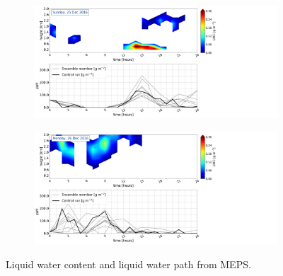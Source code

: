 \begin{figure}\ContinuedFloat
   		\centering
		\begin{subfigure}[b]{0.8\textwidth}
			\includegraphics[trim={0.5cm 0.5cm 17.5cm .5cm},clip,width=\textwidth]{./fig_LWC/20161225}
			\caption{}\label{fig:LWC25}
		\end{subfigure}
		\begin{subfigure}[b]{0.8\textwidth}
			\includegraphics[trim={0.5cm 0.5cm 17.5cm .5cm},clip,width=\textwidth]{./fig_LWC/20161226}
			\caption{}\label{fig:LWC26}
		\end{subfigure}
    \caption{Liquid water content and liquid water path from MEPS.}\label{fig:LWC}
	\end{figure}

	
